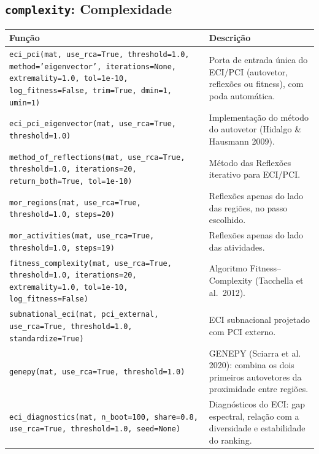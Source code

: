 \subsection{\texttt{complexity}: Complexidade}
\begin{longtable}{>{\raggedright\arraybackslash}p{9.2cm} >{\raggedright\arraybackslash}p{7.0cm}}
\toprule
\textbf{Fun\c{c}\~{a}o} & \textbf{Descri\c{c}\~{a}o} \\
\midrule\endhead
\texttt{\footnotesize eci\_pci(mat, use\_rca=True, threshold=1.0, method='eigenvector', iterations=None, extremality=1.0, tol=1e-10, log\_fitness=False, trim=True, dmin=1, umin=1)} & {\small Porta de entrada \'{u}nica do ECI/PCI (autovetor, reflex\~{o}es ou fitness), com poda autom\'{a}tica.} \\[2pt]
\texttt{\footnotesize eci\_pci\_eigenvector(mat, use\_rca=True, threshold=1.0)} & {\small Implementa\c{c}\~{a}o do m\'{e}todo do autovetor (Hidalgo \& Hausmann 2009).} \\[2pt]
\texttt{\footnotesize method\_of\_reflections(mat, use\_rca=True, threshold=1.0, iterations=20, return\_both=True, tol=1e-10)} & {\small M\'{e}todo das Reflex\~{o}es iterativo para ECI/PCI.} \\[2pt]
\texttt{\footnotesize mor\_regions(mat, use\_rca=True, threshold=1.0, steps=20)} & {\small Reflex\~{o}es apenas do lado das regi\~{o}es, no passo escolhido.} \\[2pt]
\texttt{\footnotesize mor\_activities(mat, use\_rca=True, threshold=1.0, steps=19)} & {\small Reflex\~{o}es apenas do lado das atividades.} \\[2pt]
\texttt{\footnotesize fitness\_complexity(mat, use\_rca=True, threshold=1.0, iterations=20, extremality=1.0, tol=1e-10, log\_fitness=False)} & {\small Algoritmo Fitness--Complexity (Tacchella et al.\ 2012).} \\[2pt]
\texttt{\footnotesize subnational\_eci(mat, pci\_external, use\_rca=True, threshold=1.0, standardize=True)} & {\small ECI subnacional projetado com PCI externo.} \\[2pt]
\texttt{\footnotesize genepy(mat, use\_rca=True, threshold=1.0)} & {\small GENEPY (Sciarra et al. 2020): combina os dois primeiros autovetores da proximidade entre regi\~{o}es.} \\[2pt]
\texttt{\footnotesize eci\_diagnostics(mat, n\_boot=100, share=0.8, use\_rca=True, threshold=1.0, seed=None)} & {\small Diagn\'{o}sticos do ECI: gap espectral, rela\c{c}\~{a}o com a diversidade e estabilidade do ranking.} \\[2pt]
\bottomrule
\end{longtable}


